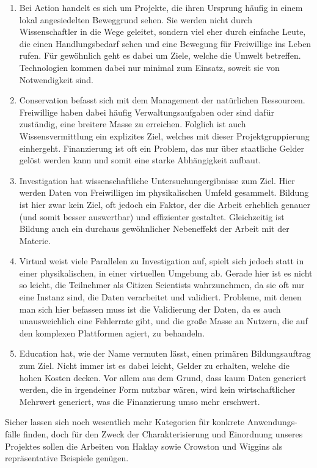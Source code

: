 \documentclass{article}
\begin{document}
\begin{enumerate}
\item{Bei Action handelt es sich um Projekte, die ihren Ursprung häufig in einem lokal angesiedelten Beweggrund sehen. Sie werden nicht durch Wissenschaftler in die Wege geleitet, sondern viel eher durch einfache Leute, die einen Handlungsbedarf sehen und eine Bewegung für Freiwillige ins Leben rufen. Für gewöhnlich geht es dabei um Ziele, welche die Umwelt betreffen. Technologien kommen dabei nur minimal zum Einsatz, soweit sie von Notwendigkeit sind.}
\item{Conservation befasst sich mit dem Management der natürlichen Ressourcen. Freiwillige haben dabei häufig Verwaltungsaufgaben oder sind dafür zuständig, eine breitere Masse zu erreichen. Folglich ist auch Wissensvermittlung ein explizites Ziel, welches mit dieser Projektgruppierung einhergeht. Finanzierung ist oft ein Problem, das nur über staatliche Gelder gelöst werden kann und somit eine starke Abhängigkeit aufbaut.}
\item{Investigation hat wissenschaftliche Untersuchungergibnisse zum Ziel. Hier werden Daten von Freiwilligen im physikalischen Umfeld gesammelt. Bildung ist hier zwar kein Ziel, oft jedoch ein Faktor, der die Arbeit erheblich genauer (und somit besser auswertbar) und effizienter gestaltet. Gleichzeitig ist Bildung auch ein durchaus gewöhnlicher Nebeneffekt der Arbeit mit der Materie.}
\item{Virtual weist viele Parallelen zu Investigation auf, spielt sich jedoch statt in einer physikalischen, in einer virtuellen Umgebung ab. Gerade hier ist es nicht so leicht, die Teilnehmer als Citizen Scientists wahrzunehmen, da sie oft nur eine Instanz sind, die Daten verarbeitet und validiert. Probleme, mit denen man sich hier befassen muss ist die Validierung der Daten, da es auch unausweichlich eine Fehlerrate gibt, und die große Masse an Nutzern, die auf den komplexen Plattformen agiert, zu behandeln.}
\item{Education hat, wie der Name vermuten lässt, einen primären Bildungsauftrag zum Ziel. Nicht immer ist es dabei leicht, Gelder zu erhalten, welche die hohen Kosten decken. Vor allem aus dem Grund, dass kaum Daten generiert werden, die in irgendeiner Form nutzbar wären, wird kein wirtschaftlicher Mehrwert generiert, was die Finanzierung umso mehr erschwert.}
\end{enumerate}
Sicher lassen sich noch wesentlich mehr Kategorien für konkrete Anwendungs-fälle finden, doch für den Zweck der Charakterisierung und Einordnung unseres Projektes sollen die Arbeiten von Haklay sowie Crowston und Wiggins als repräsentative Beispiele genügen.
\end{document}
